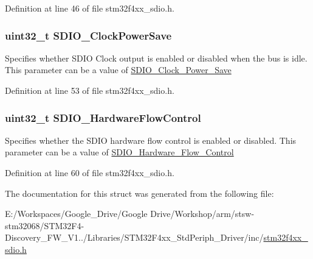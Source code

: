 Definition at line 46 of file stm32f4xx\-\_\-sdio.\-h.

\hypertarget{struct_s_d_i_o___init_type_def_a31edc8c1d4672ddb1ea60e22585398af}{
\subsubsection[{S\-D\-I\-O\-\_\-\-Clock\-Power\-Save}]{\setlength{\rightskip}{0pt plus 5cm}uint32\-\_\-t S\-D\-I\-O\-\_\-\-Clock\-Power\-Save}}\label{struct_s_d_i_o___init_type_def_a31edc8c1d4672ddb1ea60e22585398af}
Specifies whether S\-D\-I\-O Clock output is enabled or disabled when the bus is idle. This parameter can be a value of \hyperlink{group___s_d_i_o___clock___power___save}{S\-D\-I\-O\-\_\-\-Clock\-\_\-\-Power\-\_\-\-Save} 

Definition at line 53 of file stm32f4xx\-\_\-sdio.\-h.

\hypertarget{struct_s_d_i_o___init_type_def_a2acacb64a58fbff9d7a31e6e0c0a3d2e}{
\subsubsection[{S\-D\-I\-O\-\_\-\-Hardware\-Flow\-Control}]{\setlength{\rightskip}{0pt plus 5cm}uint32\-\_\-t S\-D\-I\-O\-\_\-\-Hardware\-Flow\-Control}}\label{struct_s_d_i_o___init_type_def_a2acacb64a58fbff9d7a31e6e0c0a3d2e}
Specifies whether the S\-D\-I\-O hardware flow control is enabled or disabled. This parameter can be a value of \hyperlink{group___s_d_i_o___hardware___flow___control}{S\-D\-I\-O\-\_\-\-Hardware\-\_\-\-Flow\-\_\-\-Control} 

Definition at line 60 of file stm32f4xx\-\_\-sdio.\-h.



The documentation for this struct was generated from the following file\-:\begin{DoxyCompactItemize}
\item 
E\-:/\-Workspaces/\-Google\-\_\-\-Drive/\-Google Drive/\-Workshop/arm/stsw-\/stm32068/\-S\-T\-M32\-F4-\/\-Discovery\-\_\-\-F\-W\-\_\-\-V1../\-Libraries/\-S\-T\-M32\-F4xx\-\_\-\-Std\-Periph\-\_\-\-Driver/inc/\hyperlink{stm32f4xx__sdio_8h}{stm32f4xx\-\_\-sdio.\-h}\end{DoxyCompactItemize}
